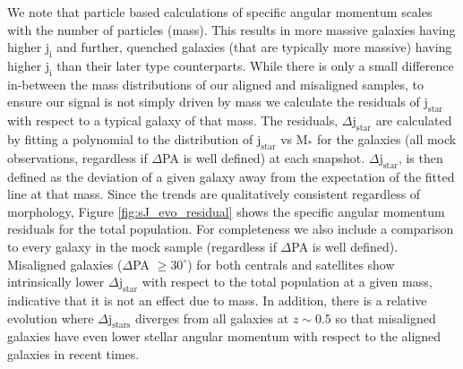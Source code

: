 We note that particle based calculations of specific angular momentum scales with the number of particles (mass). This results in more massive galaxies having higher $\mathrm{j_{i}}$ and further, quenched galaxies (that are typically more massive) having higher $\mathrm{j_{i}}$ than their later type counterparts. While there is only a small difference in-between the mass distributions of our aligned and misaligned samples, to ensure our signal is not simply driven by mass we calculate the residuals of $\mathrm{j_{star}}$ with respect to a typical galaxy of that mass. The residuals, $\Delta \mathrm{j_{star}}$ are calculated by fitting a polynomial to the distribution of $\mathrm{j_{star}}$ vs $\mathrm{M_{\ast}}$ for the galaxies (all mock observations, regardless if $\Delta$PA is well defined) at each snapshot. $\Delta \mathrm{j_{star}}$, is then defined as the deviation of a given galaxy away from the expectation of the fitted line at that mass. Since the trends are qualitatively consistent regardless of morphology, Figure \ref{fig:sJ_evo_residual} shows the specific angular momentum residuals for the total population. For completeness we also include a comparison to every galaxy in the mock sample (regardless if $\Delta$PA is well defined). Misaligned galaxies ($\Delta$PA $\geq 30^{\circ}$) for both centrals and satellites show intrinsically lower $\Delta \mathrm{j_{star}}$ with respect to the total population at a given mass, indicative that it is not an effect due to mass. In addition, there is a relative evolution where $\Delta \mathrm{j_{stars}}$ diverges from all galaxies at $z \sim 0.5$ so that misaligned galaxies have even lower stellar angular momentum with respect to the aligned galaxies in recent times. 

